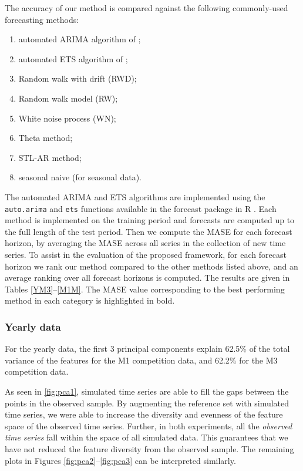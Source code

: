 \documentclass[11pt,a4paper,]{article}
\providecommand{\tightlist}{%
  \setlength{\itemsep}{0pt}\setlength{\parskip}{0pt}}
\theoremstyle{definition}
\theoremstyle{definition}
\theoremstyle{definition}
\theoremstyle{remark}
\begin{document}
The accuracy of our method is compared against the following
commonly-used forecasting methods:

\begin{enumerate}
\def\labelenumi{\arabic{enumi}.}
\tightlist
\item
  automated ARIMA algorithm of \textcite{Hyndman2008};
\item
  automated ETS algorithm of \textcite{Hyndman2008};
\item
  Random walk with drift (RWD);
\item
  Random walk model (RW);
\item
  White noise process (WN);
\item
  Theta method;
\item
  STL-AR method;
\item
  seasonal naive (for seasonal data).
\end{enumerate}

The automated ARIMA and ETS algorithms are implemented using the
\texttt{auto.arima} and \texttt{ets} functions available in the forecast
package in R \autocite{Hyndman2008}. Each method is implemented on the
training period and forecasts are computed up to the full length of the
test period. Then we compute the MASE for each forecast horizon, by
averaging the MASE across all series in the collection of new time
series. To assist in the evaluation of the proposed framework, for each
forecast horizon we rank our method compared to the other methods listed
above, and an average ranking over all forecast horizons is computed.
The results are given in Tables \ref{YM3}--\ref{M1M}. The MASE value
corresponding to the best performing method in each category is
highlighted in bold.

\subsubsection*{Yearly data}\label{yearly-data}

For the yearly data, the first 3 principal components explain 62.5\% of
the total variance of the features for the M1 competition data, and
62.2\% for the M3 competition data.

As seen in \autoref{fig:pca1}, simulated time series are able to fill
the gaps between the points in the observed sample. By augmenting the
reference set with simulated time series, we were able to increase the
diversity and evenness of the feature space of the observed time series.
Further, in both experiments, all the \emph{observed time series} fall
within the space of all simulated data. This guarantees that we have not
reduced the feature diversity from the observed sample. The remaining
plots in Figures \ref{fig:pca2}--\ref{fig:pca3} can be interpreted
similarly.
\end{document}
